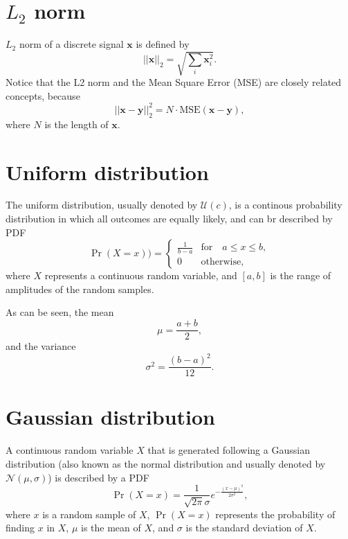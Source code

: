 
\section{$L_2$ norm}
\label{sec:L2_norm}

$L_2$ norm of a discrete signal $\mathbf{x}$ is defined by
\begin{equation}
  ||\mathbf{x}||_2 = \sqrt{\sum_i\mathbf{x}_i^2}.
\end{equation}
Notice that the L2 norm and the Mean Square Error (MSE) are closely
related concepts, because
\begin{equation}
  ||\mathbf{x} - \mathbf{y}||_2^2 = N\cdot\text{MSE}(\mathbf{x} - \mathbf{y}),
\end{equation}
where $N$ is the length of $\mathbf{x}$.


\section{Uniform distribution}

The uniform distribution, usually denoted by $\mathcal{U}(c)$, is a
continous probability distribution in which all outcomes are equally
likely, and can br described by \gls{PDF}
\begin{equation}
  \Pr(X{=}x)) =
  \begin{cases}
    \frac{1}{b-a} & \text{for}\quad a \le x \le b, \\
    0 & \text{otherwise},
  \end{cases}
\end{equation}
where $X$ represents a continuous random variable, and $[a, b]$ is the
range of amplitudes of the random samples.

As can be seen, the mean
\begin{equation}
  \mu = \frac{a+b}{2},
\end{equation}
and the variance
\begin{equation}
  \sigma^2 = \frac{(b-a)^{2}}{12}.
  \end{equation}

\section{Gaussian distribution}

A continuous random variable $X$ that is generated following a Gaussian
distribution (also known as the normal distribution and usually denoted
by $\mathcal{N}(\mu, \sigma)$) is described by a \gls{PDF}
\begin{equation}
  \Pr(X{=}x) = \frac{1}{\sqrt{2\pi}\sigma} e^{-\frac{(x-\mu)^2}{2\sigma^2} },
  \label{eq:normal_PDF}
\end{equation}
where $x$ is a random sample of $X$, $\Pr(X{=}x)$ represents the
probability of finding $x$ in $X$, $\mu$ is the mean of $X$, and
$\sigma$ is the standard deviation of $X$.


